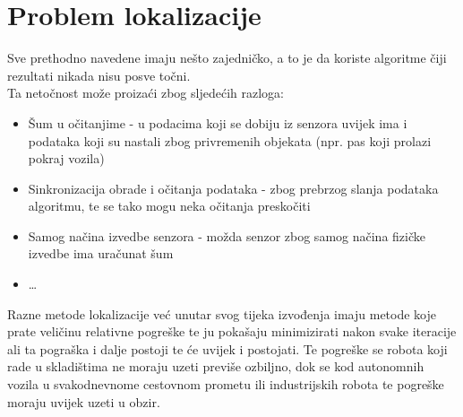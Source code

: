 \section{Problem lokalizacije}

Sve prethodno navedene imaju nešto zajedničko, a to je da koriste algoritme čiji rezultati nikada nisu posve točni.\\
Ta netočnost može proizaći zbog sljedećih razloga:

\begin{itemize}
  \item Šum u očitanjime - u podacima koji se dobiju iz senzora uvijek ima i podataka koji su nastali zbog privremenih objekata (npr. pas koji prolazi pokraj vozila)
  \item Sinkronizacija obrade i očitanja podataka - zbog prebrzog slanja podataka algoritmu, te se tako mogu neka očitanja preskočiti
  \item Samog načina izvedbe senzora - možda senzor zbog samog načina fizičke izvedbe ima uračunat šum
  \item \dots
\end{itemize}


Razne metode lokalizacije već unutar svog tijeka izvođenja imaju metode koje prate veličinu relativne pogreške te ju pokašaju minimizirati nakon svake iteracije ali ta pograška i dalje postoji te će uvijek i postojati. Te pogreške se robota koji rade u skladištima ne moraju uzeti previše ozbiljno, dok se kod autonomnih vozila u svakodnevnome cestovnom prometu ili industrijskih robota te pogreške moraju uvijek uzeti u obzir.